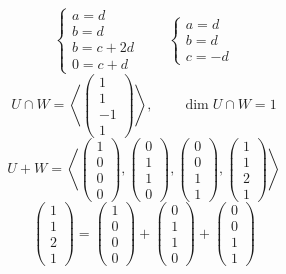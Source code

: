 $$
\begin{cases}
	a = d \\
    b = d \\
    b = c + 2d \\
    0 = c + d
\end{cases} \qquad
\begin{cases}
	a = d \\
    b = d \\
    c = -d
\end{cases} $$
$$ U \cap W = \left\langle
\begin{pmatrix}
	1 \\
    1 \\
    -1 \\
    1
\end{pmatrix} \right\rangle, \qquad \dim U \cap W = 1 $$
$$ U + W = \left\langle
\begin{pmatrix}
	1 \\
    0 \\
    0 \\
    0
\end{pmatrix},
\begin{pmatrix}
	0 \\
    1 \\
    1 \\
    0
\end{pmatrix},
\begin{pmatrix}
	0 \\
    0 \\
    1 \\
    1
\end{pmatrix},
\begin{pmatrix}
	1 \\
    1 \\
    2 \\
    1
\end{pmatrix} \right\rangle $$
$$
\begin{pmatrix}
	1 \\
    1 \\
    2 \\
    1
\end{pmatrix} =
\begin{pmatrix}
	1 \\
    0 \\
    0 \\
    0
\end{pmatrix} +
\begin{pmatrix}
	0 \\
    1 \\
    1 \\
    0
\end{pmatrix} +
\begin{pmatrix}
	0 \\
    0 \\
    1 \\
    1
\end{pmatrix} $$
